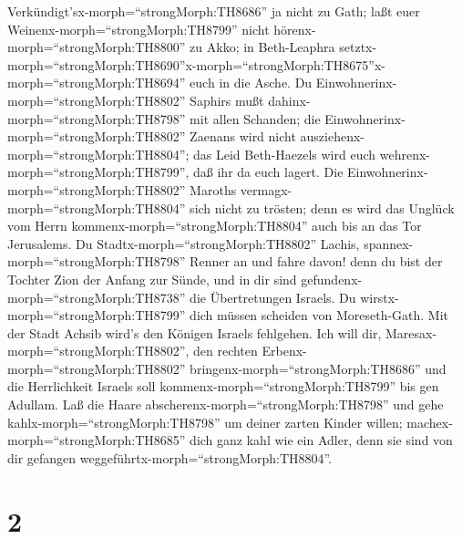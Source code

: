 Verkündigt'sx-morph=``strongMorph:TH8686'' ja nicht zu Gath; laßt euer
Weinenx-morph=``strongMorph:TH8799'' nicht
hörenx-morph=``strongMorph:TH8800'' zu Akko; in Beth-Leaphra
setztx-morph=``strongMorph:TH8690''\textbar x-morph=``strongMorph:TH8675''x-morph=``strongMorph:TH8694''
euch in die Asche.  Du
Einwohnerinx-morph=``strongMorph:TH8802'' Saphirs mußt
dahinx-morph=``strongMorph:TH8798'' mit allen Schanden; die
Einwohnerinx-morph=``strongMorph:TH8802'' Zaenans wird nicht
ausziehenx-morph=``strongMorph:TH8804''; das Leid Beth-Haezels wird euch
wehrenx-morph=``strongMorph:TH8799'', daß ihr da euch lagert.
 Die Einwohnerinx-morph=``strongMorph:TH8802'' Maroths
vermagx-morph=``strongMorph:TH8804'' sich nicht zu trösten; denn es wird
das Unglück vom Herrn kommenx-morph=``strongMorph:TH8804'' auch bis an
das Tor Jerusalems.  Du Stadtx-morph=``strongMorph:TH8802''
Lachis, spannex-morph=``strongMorph:TH8798'' Renner an und fahre davon!
denn du bist der Tochter Zion der Anfang zur Sünde, und in dir sind
gefundenx-morph=``strongMorph:TH8738'' die Übertretungen Israels.
 Du wirstx-morph=``strongMorph:TH8799'' dich müssen
scheiden von Moreseth-Gath. Mit der Stadt Achsib wird's den Königen
Israels fehlgehen.  Ich will dir,
Maresax-morph=``strongMorph:TH8802'', den rechten
Erbenx-morph=``strongMorph:TH8802''
bringenx-morph=``strongMorph:TH8686'' und die Herrlichkeit Israels soll
kommenx-morph=``strongMorph:TH8799'' bis gen Adullam.  Laß
die Haare abscherenx-morph=``strongMorph:TH8798'' und gehe
kahlx-morph=``strongMorph:TH8798'' um deiner zarten Kinder willen;
machex-morph=``strongMorph:TH8685'' dich ganz kahl wie ein Adler, denn
sie sind von dir gefangen weggeführtx-morph=``strongMorph:TH8804''.

\hypertarget{section-1}{%
\section{2}\label{section-1}}

